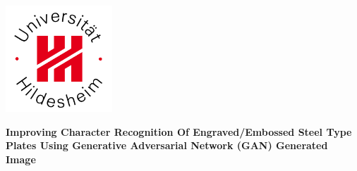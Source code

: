\documentclass[a4paper,12pt]{report}
\begin{document}
\begin{titlepage}

\center %


\vspace{-1cm}
\includegraphics[width=4cm]{logoUHi.jpg}
\vspace{1cm}


{ \Large \bfseries Improving Character Recognition Of Engraved/Embossed Steel Type Plates Using Generative Adversarial Network (GAN) Generated Image}\\  %
\vspace{1cm}



\end{titlepage}
\end{document}
